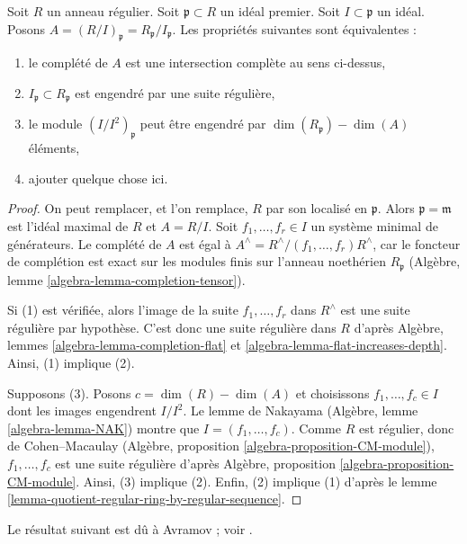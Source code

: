 \begin{lemma}
\label{lemma-quotient-regular-ring}
Soit $R$ un anneau régulier. Soit $\mathfrak p \subset R$ un idéal premier.
Soit $I \subset \mathfrak p$ un idéal.
Posons $A = (R/I)_\mathfrak p = R_\mathfrak p/I_\mathfrak p$.
Les propriétés suivantes sont équivalentes :
\begin{enumerate}
\item le complété de $A$
est une intersection complète au sens ci-dessus,
\item $I_\mathfrak p \subset R_\mathfrak p$ est engendré
par une suite régulière,
\item le module $(I/I^2)_\mathfrak p$ peut être engendré par
$\dim(R_\mathfrak p) - \dim(A)$ éléments,
\item ajouter quelque chose ici.
\end{enumerate}
\end{lemma}

\begin{proof}
On peut remplacer, et l'on remplace, $R$ par son localisé en
$\mathfrak p$.
Alors $\mathfrak p = \mathfrak m$ est l'idéal maximal de $R$
et $A = R/I$. Soit $f_1, \ldots, f_r \in I$ un système minimal
de générateurs. Le complété de $A$ est égal à
$A^\wedge = R^\wedge/(f_1, \ldots, f_r)R^\wedge$,
car le foncteur de complétion est exact sur les modules finis sur l'anneau
noethérien $R_\mathfrak p$
(Algèbre, lemme \ref{algebra-lemma-completion-tensor}).

\medskip\noindent
Si (1) est vérifiée, alors l'image de la suite $f_1, \ldots, f_r$ dans
$R^\wedge$ est une suite régulière par hypothèse. C'est donc une suite
régulière dans $R$ d'après Algèbre, lemmes
\ref{algebra-lemma-completion-flat} et
\ref{algebra-lemma-flat-increases-depth}. Ainsi, (1) implique (2).

\medskip\noindent
Supposons (3). Posons $c = \dim(R) - \dim(A)$ et choisissons
$f_1, \ldots, f_c \in I$ dont les images engendrent $I/I^2$.
Le lemme de Nakayama
(Algèbre, lemme \ref{algebra-lemma-NAK})
montre que $I = (f_1, \ldots, f_c)$. Comme $R$ est régulier, donc
de Cohen--Macaulay (Algèbre, proposition
\ref{algebra-proposition-CM-module}),
$f_1, \ldots, f_c$ est une suite régulière d'après
Algèbre, proposition \ref{algebra-proposition-CM-module}.
Ainsi, (3) implique (2).
Enfin, (2) implique (1) d'après le
lemme \ref{lemma-quotient-regular-ring-by-regular-sequence}.
\end{proof}

\noindent
Le résultat suivant est dû à Avramov ; voir \cite{Avramov}.

